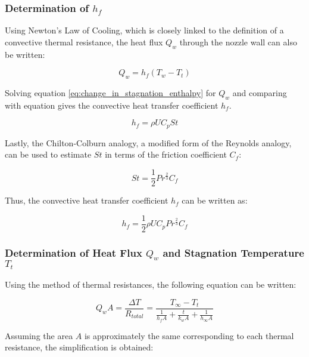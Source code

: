 \documentclass{article}
\begin{document}
\subsubsection{Determination of $h_f$}

Using Newton's Law of Cooling, which is closely linked to the definition of a convective thermal resistance, the heat flux $Q_w$ through the nozzle wall can also be written:

\begin{equation}
\label{eq:Qw_based_on_hf}
Q_w = h_f (T_w - T_t)
\end{equation}

Solving equation \ref{eq:change_in_stagnation_enthalpy} for $Q_w$ and comparing with equation \label{eq:Qw_based_on_hf} gives the convective heat transfer coefficient $h_f$.

\begin{equation}
\label{eq:hf_in_terms_of_St}
h_f = \rho U C_p St
\end{equation}

Lastly, the Chilton-Colburn analogy, a modified form of the Reynolds analogy, can be used to estimate $St$ in terms of the friction coefficient $C_f$:

\begin{equation}
\label{eq:chilton_colburn_analogy}
St = \frac{1}{2} Pr^{\frac{2}{3}} C_f
\end{equation}

Thus, the convective heat transfer coefficient $h_f$ can be written as:

\begin{equation}
\label{eq:hf_in_terms_of_Cf}
h_f = \frac{1}{2} \rho U C_p Pr^{\frac{2}{3}} C_f
\end{equation}

\subsubsection{Determination of Heat Flux $Q_w$ and Stagnation Temperature $T_t$}

Using the method of thermal resistances, the following equation can be written:

\begin{equation}
Q_w A = \frac{\Delta T}{R_{total}} = \frac{T_{\infty} - T_t}{\frac{1}{h_f A} + \frac{t}{k_w A} + \frac{1}{h_{\infty} A}}
\end{equation}

Assuming the area $A$ is approximately the same corresponding to each thermal resistance, the simplification is obtained:
\end{document}
